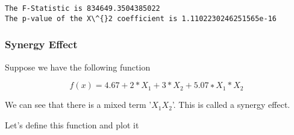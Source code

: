 \documentclass[11pt]{article}
\begin{document}
    \begin{Verbatim}[commandchars=\\\{\}]
The F-Statistic is 834649.3504385022
The p-value of the X\^{}2 coefficient is 1.1102230246251565e-16

    \end{Verbatim}

    \subsubsection{Synergy Effect}\label{synergy-effect}

Suppose we have the following function

\[f(x)=4.67+2*X_1+3*X_2+5.07∗X_1*X_2\]

We can see that there is a mixed term '\(X_1 X_2\)'. This is called a
synergy effect.

Let's define this function and plot it
\end{document}
